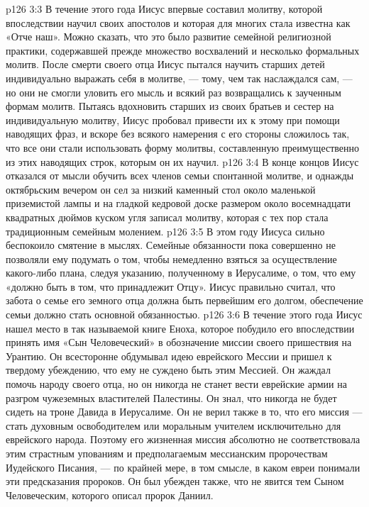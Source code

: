 \vs p126 3:3 \pc В течение этого года Иисус впервые составил молитву, которой впоследствии научил своих апостолов и которая для многих стала известна как «Отче наш». Можно сказать, что это было развитие семейной религиозной практики, содержавшей прежде множество восхвалений и несколько формальных молитв. После смерти своего отца Иисус пытался научить старших детей индивидуально выражать себя в молитве, --- тому, чем так наслаждался сам, --- но они не смогли уловить его мысль и всякий раз возвращались к заученным формам молитв. Пытаясь вдохновить старших из своих братьев и сестер на индивидуальную молитву, Иисус пробовал привести их к этому при помощи наводящих фраз, и вскоре без всякого намерения с его стороны сложилось так, что все они стали использовать форму молитвы, составленную преимущественно из этих наводящих строк, которым он их научил.
\vs p126 3:4 В конце концов Иисус отказался от мысли обучить всех членов семьи спонтанной молитве, и однажды октябрьским вечером он сел за низкий каменный стол около маленькой приземистой лампы и на гладкой кедровой доске размером около восемнадцати квадратных дюймов куском угля записал молитву, которая с тех пор стала традиционным семейным молением.
\vs p126 3:5 \pc В этом году Иисуса сильно беспокоило смятение в мыслях. Семейные обязанности пока совершенно не позволяли ему подумать о том, чтобы немедленно взяться за осуществление какого\hyp{}либо плана, следуя указанию, полученному в Иерусалиме, о том, что ему «должно быть в том, что принадлежит Отцу». Иисус правильно считал, что забота о семье его земного отца должна быть первейшим его долгом, обеспечение семьи должно стать основной обязанностью.
\vs p126 3:6 \pc В течение этого года Иисус нашел место в так называемой книге Еноха, которое побудило его впоследствии принять имя «Сын Человеческий» в обозначение миссии своего пришествия на Урантию. Он всесторонне обдумывал идею еврейского Мессии и пришел к твердому убеждению, что ему не суждено быть этим Мессией. Он жаждал помочь народу своего отца, но он никогда не станет вести еврейские армии на разгром чужеземных властителей Палестины. Он знал, что никогда не будет сидеть на троне Давида в Иерусалиме. Он не верил также в то, что его миссия --- стать духовным освободителем или моральным учителем исключительно для еврейского народа. Поэтому его жизненная миссия абсолютно не соответствовала этим страстным упованиям и предполагаемым мессианским пророчествам Иудейского Писания, --- по крайней мере, в том смысле, в каком евреи понимали эти предсказания пророков. Он был убежден также, что не явится тем Сыном Человеческим, которого описал пророк Даниил.
